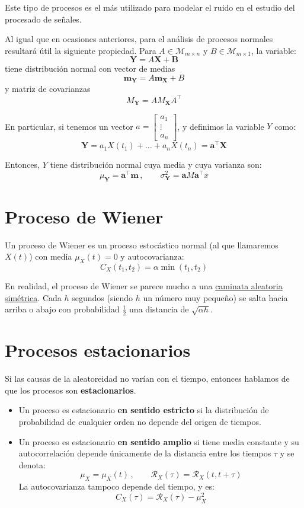 \documentclass[a4paper]{book}
\renewcommand{\vec}[1]{\mathbf{#1}} %
\begin{document}
Este tipo de procesos es el más utilizado para modelar el ruido en el estudio del procesado de señales.

Al igual que en ocasiones anteriores, para el análisis de procesos normales resultará útil la siguiente propiedad. Para $A\in \mathcal{M}_{m\times n}$ y $B\in \mathcal{M}_{m\times 1}$, la variable:
\[ \vec{Y} = A \vec{X} + \vec{B} \]
tiene distribución normal con vector de medias
\[ \vec{m}_{\vec{Y}}= A \vec{m}_{\vec{X}} + B\]
y matriz de covarianzas
\[ M_{\vec{Y}} = A M_{\vec{X}} A ^{\top} \]

En particular, si tenemos un vector $a=\left[
		\begin{matrix}
			a_1    \\
			\vdots \\
			a_n
		\end{matrix} \right]$, y definimos la variable $Y$ como:
\[ \vec{Y}= a_1X(t_1) + \dots + a_nX(t_n) = \vec{a}^{\top}  \vec{X}\]

Entonces, $Y$ tiene distribución normal cuya media y cuya varianza son:
\[ \mu _{\vec{Y}} = \vec{a} ^{\top} \vec{m} \, , \qquad \sigma ^2 _{\vec{Y}} = \vec{a} M \vec{a}^{\top} x\]

\section{Proceso de Wiener}

Un proceso de Wiener es un proceso estocástico normal (al que llamaremos $X(t)$) con media $\mu _X (t) = 0$ y autocovarianza:
\[ C_X \left( t_1, t_2 \right) = \alpha \min\left( t_1, t_2 \right)\]

En realidad, el proceso de Wiener se parece mucho a una \hyperref[sec:caminata_aleatoria_simetrica]{caminata aleatoria simétrica}. Cada $h$ segundos (siendo $h$ un número muy pequeño) se salta hacia arriba o abajo con probabilidad $\frac{1}{2}$ una distancia de $\sqrt{\alpha h}$.

\section{Procesos estacionarios}

Si las causas de la aleatoreidad no varían con el tiempo, entonces hablamos de que los procesos son \textbf{estacionarios}.

\begin{itemize}
	\item Un proceso es estacionario \textbf{en sentido estricto} si la distribución de probabilidad de cualquier orden no depende del origen de tiempos.
	\item Un proceso es estacionario \textbf{en sentido amplio} si tiene media constante y su autocorrelación depende únicamente de la distancia entre los tiempos $\tau$ y se denota:
	      \[ \mu _X = \mu _X(t) \, , \qquad \mathcal{R}_X \left( \tau \right) = \mathcal{R}_X \left( t, t+ \tau \right) \]
	      La autocovarianza tampoco depende del tiempo, y es:
	      \[ C_X(\tau ) = \mathcal{R}_X(\tau )-\mu_X^2 \]
\end{itemize}
\end{document}
